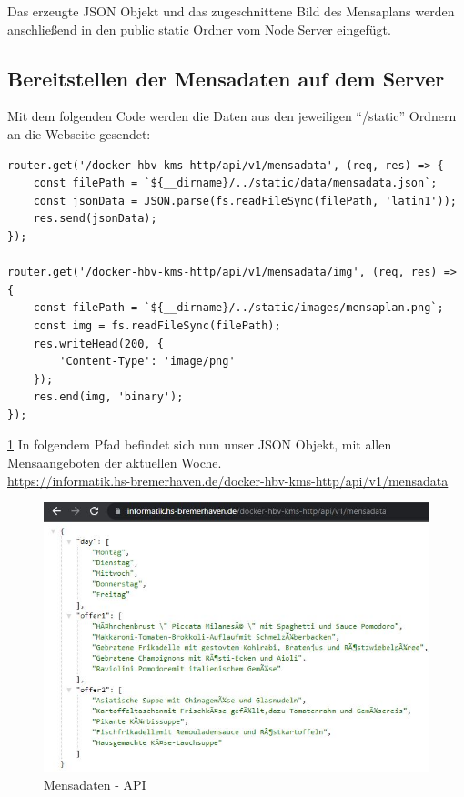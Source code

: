 Das erzeugte JSON Objekt und das zugeschnittene Bild des Mensaplans werden anschließend in den public static Ordner vom Node Server eingefügt.

\subsection{Bereitstellen der Mensadaten auf dem Server}

Mit dem folgenden Code werden die Daten aus den jeweiligen “/static” Ordnern an die Webseite gesendet:

\begin{lstlisting}
router.get('/docker-hbv-kms-http/api/v1/mensadata', (req, res) => {
    const filePath = `${__dirname}/../static/data/mensadata.json`;
    const jsonData = JSON.parse(fs.readFileSync(filePath, 'latin1'));
    res.send(jsonData);
});

router.get('/docker-hbv-kms-http/api/v1/mensadata/img', (req, res) => {
    const filePath = `${__dirname}/../static/images/mensaplan.png`;
    const img = fs.readFileSync(filePath);
    res.writeHead(200, {
        'Content-Type': 'image/png'
    });
    res.end(img, 'binary');
});    
\end{lstlisting}

\ref{fig:mensaapi} In folgendem Pfad befindet sich nun unser JSON Objekt, mit allen Mensaangeboten der aktuellen Woche.\\
\url{https://informatik.hs-bremerhaven.de/docker-hbv-kms-http/api/v1/mensadata}

\begin{figure}[H]
    \centering
    \includegraphics[width=13cm]{Figures/AppChapter/mensa_5.JPG}
    \caption{Mensadaten - API}
    \label{fig:mensaapi}
    \centering
\end{figure}

